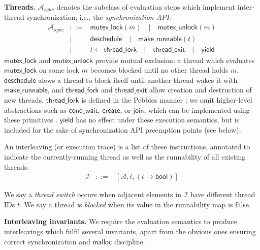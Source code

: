 {\bf Threads.}
$\mathcal{A}_{sync}$ denotes the subclass of evaluation steps which implement inter-thread synchronization; i.e., the {\em synchronization API}:
\begin{eqnarray*}
	\mathcal{A}_{sync} &::=& \mathsf{mutex\_lock}(m) \quad | \quad \mathsf{mutex\_unlock}(m) \\
		&|& \mathsf{deschedule} \quad | \quad \mathsf{make\_runnable}(t) \\
		&|& t \leftarrow \mathsf{thread\_fork} \quad | \quad \mathsf{thread\_exit} \quad | \quad \mathsf{yield}
\end{eqnarray*}
$\mathsf{mutex\_lock}$ and
$\mathsf{mutex\_unlock}$ provide mutual exclusion:
a thread which evaluates $\mathsf{mutex\_lock}$ on some lock $m$ becomes blocked until no other thread holds $m$.
$\mathsf{deschedule}$ alows a thread to block itself until another thread wakes it with $\mathsf{make\_runnable}$,
%
and $\mathsf{thread\_fork}$ and $\mathsf{thread\_exit}$ allow creation and destruction of new threads.
$\mathsf{thread\_fork}$ is defined in the Pebbles manner \cite{kspec};
we omit higher-level abstractions such as $\mathsf{cond\_wait}$, $\mathsf{create}$, or $\mathsf{join}$, which can be implemented using these primitives \cite{thrlib}.
$\mathsf{yield}$ has no effect under these execution semantics, but is included for the sake of synchronization API preemption points (see below).

\begin{definition}[Interleaving]
An interleaving (or execution trace) is a list of these instructions, annotated to indicate the currently-running thread as well as the runnability of all existing threads:
\begin{eqnarray*}
	\mathcal{I} &::=& [\mathcal{A}, t, (t \rightarrow \mathsf{bool})]
\end{eqnarray*}
\end{definition}

We say a {\em thread switch} occurs when adjacent elements in $\mathcal{I}$ have different thread IDs $t$.
%
We say a thread is {\em blocked} when its value in the runnability map is false.

{\bf Interleaving invariants.}
We require the evaluation semantics to produce interleavings which fulfil several invariants,
apart from the obvious ones ensuring correct synchronization and $\mathsf{malloc}$ discipline.

